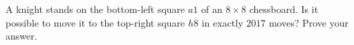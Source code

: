 A knight stands on the bottom-left square $a1$ of an $8\times8$ chessboard. Is it possible to move it to the top-right square $h8$ in exactly $2017$ moves? Prove your answer.
